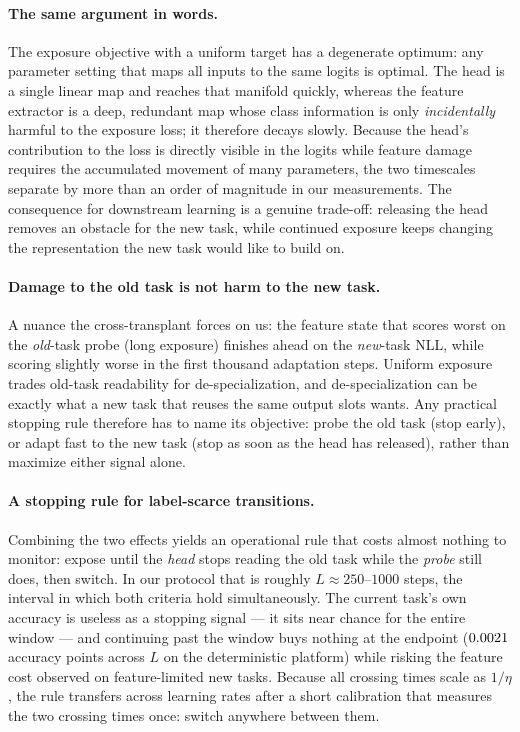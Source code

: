 \documentclass[review,12pt]{elsarticle}
\begin{document}
\paragraph{The same argument in words.}
The exposure objective with a uniform target has a degenerate optimum: any
parameter setting that maps all inputs to the same logits is optimal. The head
is a single linear map and reaches that manifold quickly, whereas the feature
extractor is a deep, redundant map whose class information is only
\emph{incidentally} harmful to the exposure loss; it therefore decays slowly.
Because the head's contribution to the loss is directly visible in the logits
while feature damage requires the accumulated movement of many parameters, the
two timescales separate by more than an order of magnitude in our
measurements. The consequence for downstream learning is a genuine trade-off:
releasing the head removes an obstacle for the new task, while continued
exposure keeps changing the representation the new task would like to build
on.

\paragraph{Damage to the old task is not harm to the new task.}
A nuance the cross-transplant forces on us: the feature state that scores
worst on the \emph{old}-task probe (long exposure) finishes ahead on the
\emph{new}-task NLL, while scoring slightly worse in the first thousand
adaptation steps. Uniform exposure trades old-task readability for
de-specialization, and de-specialization can be exactly what a new task that
reuses the same output slots wants. Any practical stopping rule therefore has
to name its objective: probe the old task (stop early), or adapt fast to the
new task (stop as soon as the head has released), rather than maximize
either signal alone.

\paragraph{A stopping rule for label-scarce transitions.}
Combining the two effects yields an operational rule that costs almost
nothing to monitor: expose until the \emph{head} stops reading the old task
while the \emph{probe} still does, then switch. In our protocol that is
roughly $L\approx250$--$1000$ steps, the interval in which both criteria hold
simultaneously. The current task's own accuracy is useless as a stopping
signal --- it sits near chance for the entire window --- and continuing past
the window buys nothing at the endpoint ($0.0021$ accuracy points across
$L$ on the deterministic platform) while risking the feature cost observed on
feature-limited new tasks. Because all crossing times scale as $1/\eta$, the
rule transfers across learning rates after a short calibration that measures
the two crossing times once: switch anywhere between them.
\end{document}

